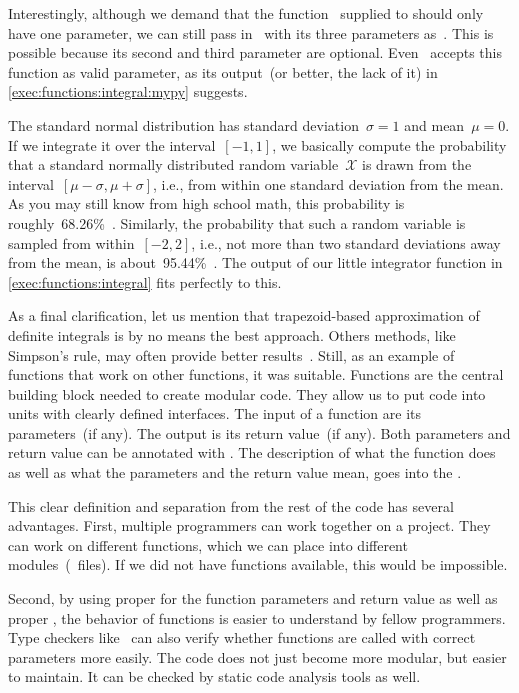 Interestingly, although we demand that the function~ supplied to  should only have one parameter, we can still pass in~ with its three parameters as~.
This is possible because its second and third parameter are optional.
Even \mypy\ accepts this function as valid parameter, as its output~(or better, the lack of it) in \cref{exec:functions:integral:mypy} suggests.

The standard normal distribution has standard deviation~$\sigma=1$ and mean~$\mu=0$.
If we integrate it over the interval~$[-1,1]$, we basically compute the probability that a standard normally distributed random variable~${\mathcal{X}}$ is drawn from the interval~$[\mu-\sigma,\mu+\sigma]$, i.e., from within one standard deviation from the mean.
As you may still know from high school math, this probability is roughly~68.26\%~\cite{AS1972HOMFWFGAMT,EHP2000SD,W2007HBOSDFE}.
Similarly, the probability that such a random variable is sampled from within~$[-2,2]$, i.e., not more than two standard deviations away from the mean, is about~95.44\%~\cite{AS1972HOMFWFGAMT,EHP2000SD,W2007HBOSDFE}.
The output of our little integrator function in \cref{exec:functions:integral} fits perfectly to this.

As a final clarification, let us mention that trapezoid-based approximation of definite integrals is by no means the best approach.
Others methods, like Simpson's rule, may often provide better results~\cite{E2013AITNMAA}.
Still, as an example of functions that work on other functions, it was suitable.%
\FloatBarrier%
\endhsection%
%
%
Functions are the central building block needed to create modular code.
They allow us to put code into units with clearly defined interfaces.
The input of a function are its parameters~(if any).
The output is its return value~(if any).
Both parameters and return value can be annotated with .
The description of what the function does as well as what the parameters and the return value mean, goes into the .

This clear definition and separation from the rest of the code has several advantages.
First, multiple programmers can work together on a project.
They can work on different functions, which we can place into different modules~(\python\ files).
If we did not have functions available, this would be impossible.

Second, by using proper  for the function parameters and return value as well as proper , the behavior of functions is easier to understand by fellow programmers.
Type checkers like \mypy\ can also verify whether functions are called with correct parameters more easily.
The code does not just become more modular, but easier to maintain.
It can be checked by static code analysis tools as well.

